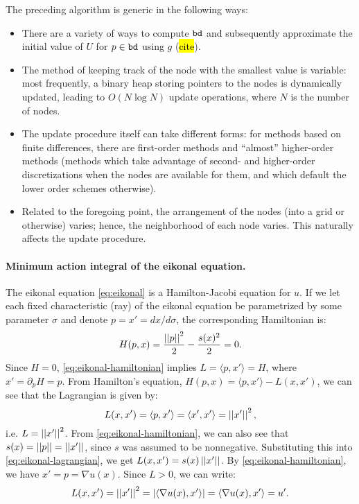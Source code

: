 \documentclass[eikonal.tex]{subfiles}
\begin{document}
The preceding algorithm is generic in the following ways:
\begin{itemize}
\item There are a variety of ways to compute $\texttt{bd}$ and
  subsequently approximate the initial value of $U$ for
  $p \in \texttt{bd}$ using $g$ (\hl{cite}).
\item The method of keeping track of the node with the smallest value
  is variable: most frequently, a binary heap storing pointers to the
  nodes is dynamically updated, leading to $O(N \log N)$ update
  operations, where $N$ is the number of nodes.
\item The update procedure itself can take different forms: for
  methods based on finite differences, there are first-order methods
  and ``almost'' higher-order methods (methods which take advantage of
  second- and higher-order discretizations when the nodes are
  available for them, and which default the lower order schemes
  otherwise).
\item Related to the foregoing point, the arrangement of the nodes
  (into a grid or otherwise) varies; hence, the neighborhood of each
  node varies. This naturally affects the update procedure.
\end{itemize}

\paragraph{Minimum action integral of the eikonal equation.} The
eikonal equation \cref{eq:eikonal} is a Hamilton-Jacobi equation for
$u$. If we let each fixed characteristic (ray) of the eikonal equation
be parametrized by some parameter $\sigma$ and denote
$p = x' = dx/d\sigma$, the corresponding Hamiltonian is:
\begin{equation}
  \label{eq:eikonal-hamiltonian}
  H{(p, x)} = \frac{\norm{p}^2}{2} - \frac{s(x)^2}{2} = 0.
\end{equation}
Since $H = 0$, \cref{eq:eikonal-hamiltonian} implies
$L = \langle p, x'\rangle = H$, where $x' = \partial_p H = p$.  From
Hamilton's equation, $H(p, x) = \langle p, x'\rangle - L(x, x')$, we
can see that the Lagrangian is given by:
\begin{equation}
  \label{eq:eikonal-lagrangian}
  L(x, x') = \langle p, x'\rangle = \langle x', x'\rangle = \norm{x'}^2,
\end{equation}
i.e. $L = \left|\left|x'\right|\right|^2$. From \cref{eq:eikonal-hamiltonian}, we can
also see that $s(x) = \left|\left|p\right|\right| = \left|\left|x'\right|\right|$, since $s$ was assumed to
be nonnegative. Substituting this into \cref{eq:eikonal-lagrangian},
we get $L(x, x') = s(x) \left|\left|x'\right|\right|$. By \cref{eq:eikonal-hamiltonian},
we have $x' = p = \nabla u(x)$. Since $L > 0$, we can write:
\begin{equation}
  L(x, x') = \left|\left|x'\right|\right|^2 = \left|\langle \nabla u(x), x'\rangle\right| = \langle \nabla u(x), x'\rangle = u'.
\end{equation}
\end{document}
